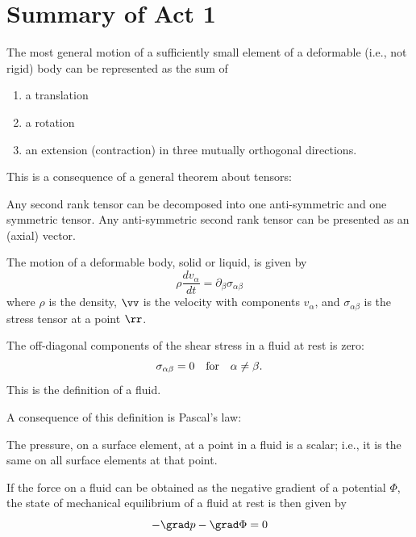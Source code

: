 \section*{Summary of Act 1}
\begin{thm-non}
The most general motion of a sufficiently small element of a
deformable (i.e., not rigid) body can be represented as the sum of 
\begin{enumerate}
\item a translation
\item a rotation
\item an extension (contraction) in three mutually orthogonal
  directions. 
\end{enumerate}
\end{thm-non}
This is a consequence of a general theorem about tensors:
\begin{thm-non}
Any second rank tensor can be decomposed into one
anti-symmetric and one symmetric tensor.  Any anti-symmetric second
rank tensor can be presented as an (axial) vector. 
\end{thm-non}
The motion of a deformable body, solid or liquid, is given by 
\begin{equation}
\rho\frac{dv_{\alpha}}{dt} = \partial_{\beta}\sigma_{\alpha\beta}
\nonumber
\end{equation}
where $\rho$ is the density, $\vv$ is the velocity with components
$v_{\alpha}$,
and $\sigma_{\alpha\beta}$ is the stress tensor at a point $\rr$. 
\begin{def-non}
The off-diagonal components of the shear stress in a fluid at rest is
zero:
\begin{equation}
\sigma_{\alpha\beta} = 0 \quad\text{for}\quad \alpha \neq \beta \/.
\nonumber
\end{equation}
This is the definition of a fluid.
\end{def-non}
A consequence of this definition is Pascal's law:
\begin{thm-non}
The pressure, on a surface element, at a point in a fluid is a scalar;
i.e., it is the same on all surface elements at that point.  
\end{thm-non}
 If the force on a fluid can be obtained as the negative gradient of a potential
$\Phi$, the state of mechanical equilibrium of a fluid
at rest is then given by 
\begin{equation}
-\grad p - \grad \Phi = 0 
\nonumber
\end{equation}
